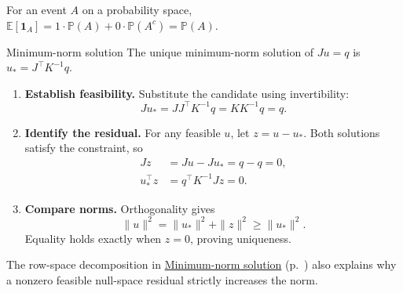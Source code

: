 \documentclass[11pt,a4paper]{article}
\begin{document}
For an event $A$ on a probability space,
$\mathbb E[\mathbf 1_A]=1\cdot\mathbb P(A)+0\cdot\mathbb P(A^c)=\mathbb P(A)$.

\begin{reviewmethod}{Minimum-norm solution}
The unique minimum-norm solution of $Ju=q$ is $u_*=J^\top K^{-1}q$.
\end{reviewmethod}
\begin{enumerate}
\item \textbf{Establish feasibility.} Substitute the candidate using invertibility:
\[
Ju_*=JJ^\top K^{-1}q=KK^{-1}q=q.
\]
\item \textbf{Identify the residual.} For any feasible $u$, let $z=u-u_*$. Both solutions satisfy the constraint, so
\[
\begin{aligned}
Jz&=Ju-Ju_*=q-q=0,\\
u_*^\top z&=q^\top K^{-1}Jz=0.
\end{aligned}
\]
\item \textbf{Compare norms.} Orthogonality gives
\[
\|u\|^2=\|u_*\|^2+\|z\|^2\ge\|u_*\|^2.
\]
Equality holds exactly when $z=0$, proving uniqueness.
\end{enumerate}
The row-space decomposition in \hyperref[minimum-norm]{Minimum-norm solution}
(p.~\pageref{minimum-norm}) also explains why a nonzero feasible null-space
residual strictly increases the norm.
\end{document}
